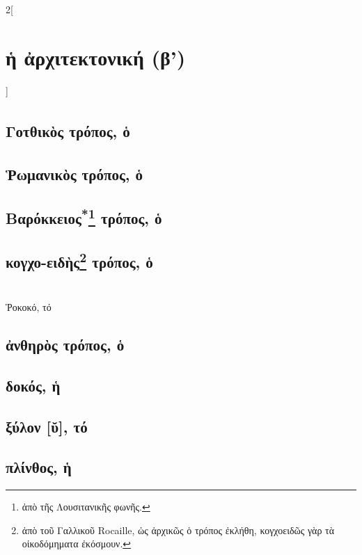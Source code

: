 \documentclass{book}
\begin{document}
\newpage  
\begin{multicols}{2}[\section{ἡ ἀρχιτεκτονική (β')}]
\subsection{Γοτθικὸς\textsuperscript{\textdagger} τρόπος, ὁ}
\subsection{Ῥωμανικὸς\textsuperscript{\textdagger} τρόπος, ὁ}
\subsection{Βαρόκκειος\textsuperscript{*}\protect\footnote{ἀπὸ τῆς Λουσιτανικῆς φωνῆς.} τρόπος, ὁ}
\subsection{κογχο-ειδὴς\protect\footnote{ἀπὸ τοῦ Γαλλικοῦ Rocaille, ὡς ἀρχικῶς ὁ τρόπος ἐκλήθη, κογχοειδῶς γὰρ τὰ οἰκοδόμηματα ἐκόσμουν.} τρόπος, ὁ}
  ~\\
Ῥοκοκό\textsuperscript{\textdagger}, τό
\subsection{ἀνθηρὸς τρόπος, ὁ}
\subsection{δοκός, ἡ}
\subsection{ξύλον [ῠ], τό}
\subsection{πλίνθος, ἡ}

\end{multicols}
\end{document}
